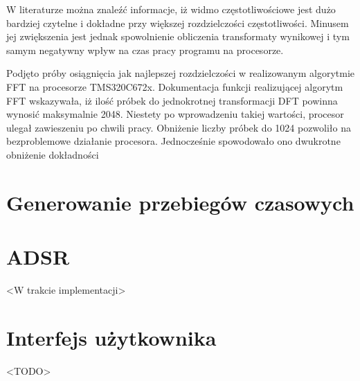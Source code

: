W literaturze można znaleźć informacje, iż widmo częstotliwościowe jest dużo bardziej czytelne i dokładne przy większej rozdzielczości częstotliwości. Minusem jej zwiększenia jest jednak spowolnienie obliczenia transformaty wynikowej i tym samym negatywny wpływ na czas pracy programu na procesorze.

Podjęto próby osiągnięcia jak najlepszej rozdzielczości w realizowanym algorytmie FFT na procesorze TMS320C672x. Dokumentacja funkcji realizującej algorytm FFT wskazywała, iż ilość próbek do jednokrotnej transformacji DFT powinna wynosić maksymalnie 2048. Niestety po wprowadzeniu takiej wartości, procesor ulegał zawieszeniu po chwili pracy. Obniżenie liczby próbek do 1024 pozwoliło na bezproblemowe działanie procesora. Jednocześnie spowodowało ono dwukrotne obniżenie dokładności


\section{Generowanie przebiegów czasowych}


\section{ADSR}
<W trakcie implementacji>


\section{Interfejs użytkownika}
<TODO>